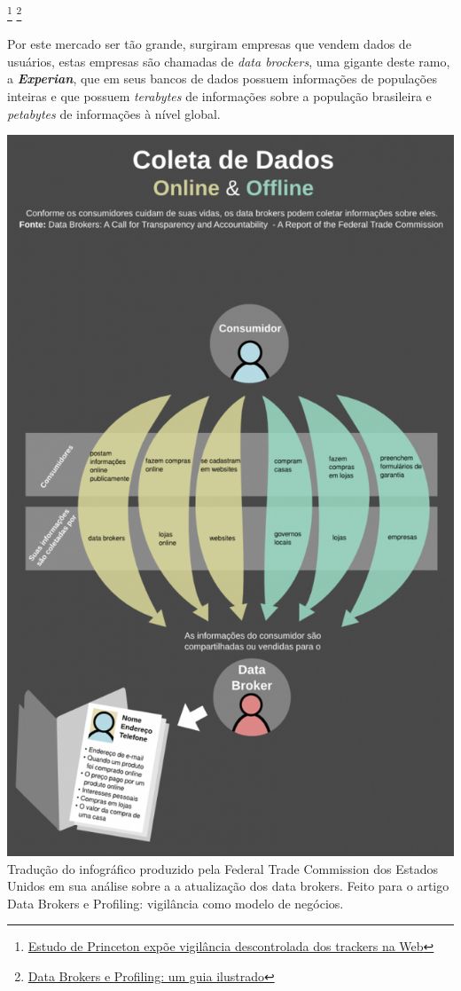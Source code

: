 \documentclass[12pt, letterpaper, Monospace:12]{report}
\begin{document}
\footnote{\href{https://antivigilancia.org/pt/2016/06/webcensus/}{Estudo de Princeton expõe vigilância descontrolada dos trackers na Web}}
\footnote{\href{https://antivigilancia.org/pt/2015/05/data-brokers-e-profiling-um-guia-ilustrado/}{Data Brokers e Profiling: um guia ilustrado}}

	Por este mercado ser tão grande, surgiram empresas que vendem dados de usuários, estas empresas são chamadas de \textit{data brockers}, uma gigante deste ramo, a \textbf{\textit{Experian}}, que em seus bancos de dados possuem informações de populações inteiras e que possuem \textit{terabytes} de informações sobre a população brasileira e \textit{petabytes} de informações à nível global.\\

	\begin{center}
		\includegraphics[scale=0.60]{databrokers.png}\\
		\footnotesize Tradução do infográfico produzido pela Federal Trade Commission dos Estados Unidos em sua análise sobre a a atualização dos data brokers. Feito para o artigo Data Brokers e Profiling: vigilância como modelo de negócios.
	\end{center}
\end{document}

